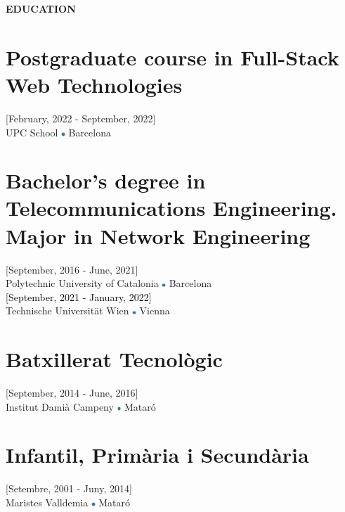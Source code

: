 \documentclass[../main.tex]{subfiles}
\begin{document}
    \vspace*{0.5cm}
    \textbf{\textcolor{myCV2}{EDUCATION\underline{\hspace{7.62cm}}}}
        \vspace*{-0.3cm}
        
        \section*{Postgraduate course in Full-Stack Web Technologies}
        \vspace*{-0.4cm}
        [February, 2022 - September, 2022] \\
        UPC School
        \includegraphics[width=0.15cm]{assets/full.png} 
        Barcelona
        
        \vspace*{-0.25cm}
        \section*{Bachelor's degree in Telecommunications Engineering. Major in Network Engineering}
        \vspace*{-0.4cm}
        [September, 2016 - June, 2021] \\
        Polytechnic University of Catalonia 
        \includegraphics[width=0.15cm]{assets/full.png} 
        Barcelona \\
        \textcolor{black}{[September, 2021 - January, 2022]}\\
        Technische Universität Wien
        \includegraphics[width=0.15cm]{assets/full.png} 
        Vienna
        
        \vspace*{-0.25cm}
        \section*{Batxillerat Tecnològic}
        \vspace*{-0.4cm}
        [September, 2014 - June, 2016] \\
        Institut Damià Campeny
        \includegraphics[width=0.15cm]{assets/full.png} 
        Mataró

        \vspace*{-0.25cm}
        \section*{Infantil, Primària i Secundària}
        \vspace*{-0.4cm}
        [Setembre, 2001 - Juny, 2014]\\
        Maristes Valldemia
        \includegraphics[width=0.15cm]{assets/full.png} 
        Mataró
\end{document}
